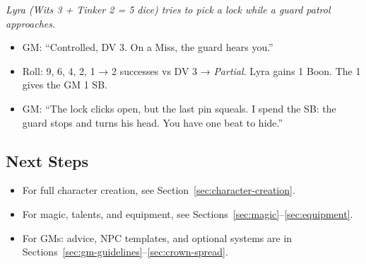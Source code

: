 \textit{Lyra (Wits 3 + Tinker 2 = 5 dice) tries to pick a lock while a guard patrol approaches.}

\begin{itemize}
  \item GM: “Controlled, DV 3. On a Miss, the guard hears you.”
  \item Roll: 9, 6, 4, 2, 1 → 2 successes vs DV 3 → \textit{Partial}. Lyra gains 1 Boon. The 1 gives the GM 1 SB.
  \item GM: “The lock clicks open, but the last pin squeals. I spend the SB: the guard stops and turns his head. You have one beat to hide.”
\end{itemize}

\subsection*{Next Steps}

\begin{itemize}
  \item For full character creation, see Section~\ref{sec:character-creation}.
  \item For magic, talents, and equipment, see Sections~\ref{sec:magic}–\ref{sec:equipment}.
  \item For GMs: advice, NPC templates, and optional systems are in Sections~\ref{sec:gm-guidelines}–\ref{sec:crown-spread}.
\end{itemize}

